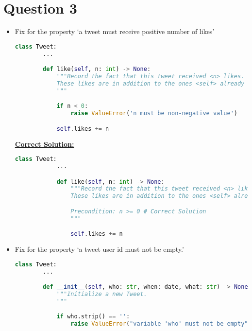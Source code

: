\documentclass[12pt]{article}
\begin{document}
\section*{Question 3}
\begin{itemize}
    \item Fix for the property `a tweet must receive positive number of likes'

    \begin{lstlisting}[language=Python]
    class Tweet:
        ...

        def like(self, n: int) -> None:
            """Record the fact that this tweet received <n> likes.
            These likes are in addition to the ones <self> already has.
            """

            if n < 0:
                raise ValueError('n must be non-negative value')

            self.likes += n
    \end{lstlisting}

    \bigskip

    \begin{mdframed}
        \underline{\textbf{Correct Solution:}}

        \bigskip

        \begin{lstlisting}[language=Python]
            class Tweet:
            ...

            def like(self, n: int) -> None:
                """Record the fact that this tweet received <n> likes.
                These likes are in addition to the ones <self> already has.

                Precondition: n >= 0 # Correct Solution
                """

                self.likes += n
        \end{lstlisting}
    \end{mdframed}

    \item Fix for the property `a tweet user id must not be empty.'

    \begin{lstlisting}[language=Python]
    class Tweet:
        ...

        def __init__(self, who: str, when: date, what: str) -> None:
            """Initialize a new Tweet.
            """

            if who.strip() == '':
                raise ValueError("variable 'who' must not be empty")


\end{lstlisting}
\end{itemize}
\end{document}
